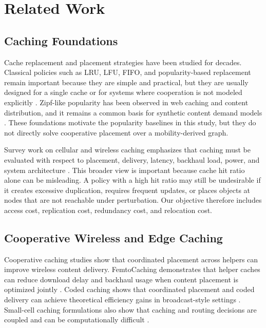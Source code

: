 \section{Related Work}

\subsection{Caching Foundations}

Cache replacement and placement strategies have been studied for decades. Classical policies such as LRU, LFU, FIFO, and popularity-based replacement remain important because they are simple and practical, but they are usually designed for a single cache or for systems where cooperation is not modeled explicitly \cite{Podlipnig2003}. Zipf-like popularity has been observed in web caching and content distribution, and it remains a common basis for synthetic content demand models \cite{breslau1999zipf}. These foundations motivate the popularity baselines in this study, but they do not directly solve cooperative placement over a mobility-derived graph.

Survey work on cellular and wireless caching emphasizes that caching must be evaluated with respect to placement, delivery, latency, backhaul load, power, and system architecture \cite{Li2018CachingSurvey,Paschos2018RoleCaching}. This broader view is important because cache hit ratio alone can be misleading. A policy with a high hit ratio may still be undesirable if it creates excessive duplication, requires frequent updates, or places objects at nodes that are not reachable under perturbation. Our objective therefore includes access cost, replication cost, redundancy cost, and relocation cost.

\subsection{Cooperative Wireless and Edge Caching}

Cooperative caching studies show that coordinated placement across helpers can improve wireless content delivery. FemtoCaching demonstrates that helper caches can reduce download delay and backhaul usage when content placement is optimized jointly \cite{Shanmugam2013,Golrezaei2014JSAC}. Coded caching shows that coordinated placement and coded delivery can achieve theoretical efficiency gains in broadcast-style settings \cite{MaddahAli2014}. Small-cell caching formulations also show that caching and routing decisions are coupled and can be computationally difficult \cite{Poularakis2014Approx}.

